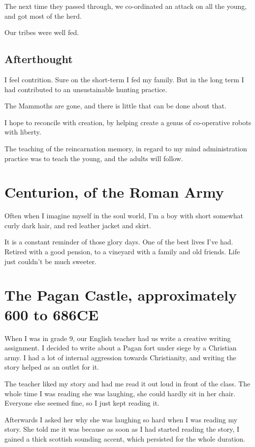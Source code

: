 The next time they passed through, we co-ordinated an attack on all the young, 
and got most of the herd. 

Our tribes were well fed. 

\section{Afterthought}

I feel contrition. Sure on the short-term I fed my family. But in the long term
I had contributed to an unsustainable hunting practice. 

The Mammoths are gone, and there is little that can be done about that. 

I hope to reconcile with creation, by helping create a genus of co-operative
robots with liberty. 

The teaching of the reincarnation memory, in regard to my mind administration
practice was to teach the young, and the adults will follow.
 
\chapter{Centurion, of the Roman Army}

Often when I imagine myself in the soul world, I'm a boy with short somewhat
curly dark hair, and red leather jacket and skirt. 

It is a constant reminder of those glory days. 
One of the best lives I've had. Retired with a good pension, to a vineyard with
a family and old friends. Life just couldn't be much sweeter. 

\chapter{The Pagan Castle, approximately 600 to 686CE}
\label{reincarnation:arwald}
When I was in grade 9, our English teacher had us write a creative writing
assignment. I decided to write about a Pagan fort under siege by a Christian
army.  I had a lot of internal aggression towards Christianity, and writing the
story helped as an outlet for it. 

The teacher liked my story and had me read it out loud in front of the class.
The whole time I was reading she was laughing, she could hardly sit in her
chair. Everyone else seemed fine, so I just kept reading it. 

Afterwards I asked her why she was laughing so hard when I was reading my story. 
She told me it was because as soon as I had started reading the story, I gained
a thick scottish sounding accent, which persisted for the whole duration. 

